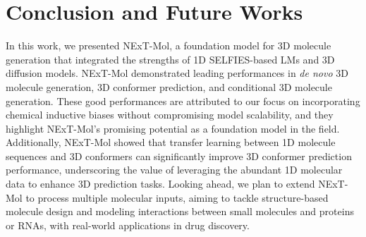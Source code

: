 

\vspace{-1mm}
\section{Conclusion and Future Works}
\vspace{-1mm}
In this work, we presented NExT-Mol, a foundation model for 3D molecule generation that integrated the strengths of 1D SELFIES-based LMs and 3D diffusion models. NExT-Mol demonstrated leading performances in \textit{de novo} 3D molecule generation, 3D conformer prediction, and conditional 3D molecule generation. These good performances are attributed to our focus on incorporating chemical inductive biases without compromising model scalability, and they highlight NExT-Mol's promising potential as a foundation model in the field. 
Additionally, NExT-Mol showed that transfer learning between 1D molecule sequences and 3D conformers can significantly improve 3D conformer prediction performance, underscoring the value of leveraging the abundant 1D molecular data to enhance 3D prediction tasks. 
Looking ahead, we plan to extend NExT-Mol to process multiple molecular inputs, aiming to tackle structure-based molecule design and modeling interactions between small molecules and proteins or RNAs, with real-world applications in drug discovery.

